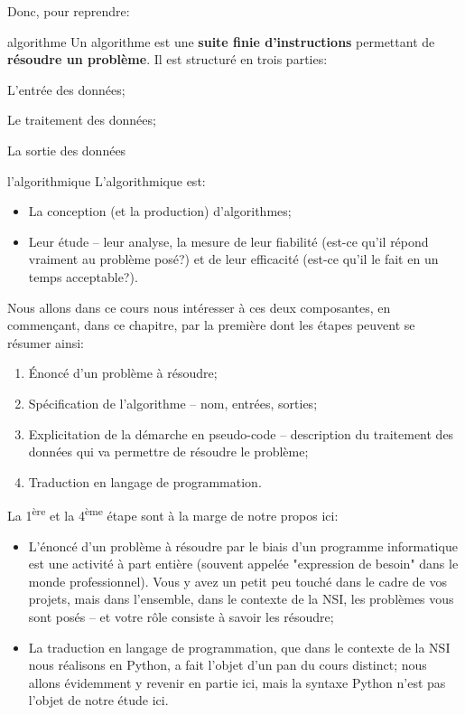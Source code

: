 \documentclass[12pt]{article}
\begin{document}
	Donc, pour reprendre:
	\begin{MaDef}{algorithme}
		Un algorithme est une \textbf{suite finie d'instructions} permettant de \textbf{résoudre un problème}. Il est structuré en trois parties:
		\begin{alphenum}
			\item L'entrée des données;
			\item Le traitement des données;
			\item La sortie des données 
		\end{alphenum}
	\end{MaDef}
	
	\begin{MaDef}{l'algorithmique}
		L'algorithmique est:
		\begin{itemize}
			\item La conception (et la production) d'algorithmes;
			\item Leur étude -- leur analyse, la mesure de leur fiabilité (est-ce qu'il répond vraiment au problème posé?) et de leur efficacité (est-ce qu'il le fait en un temps acceptable?).
		\end{itemize}
	\end{MaDef}
	
	Nous allons dans ce cours nous intéresser à ces deux composantes, en commençant, dans ce chapitre, par la première dont les étapes peuvent se résumer ainsi:
	\begin{enumerate}
		\item Énoncé d'un problème à résoudre;
		\item Spécification de l'algorithme -- nom, entrées, sorties;
		\item Explicitation de la démarche en pseudo-code -- description du traitement des données qui va permettre de résoudre le problème;
		\item Traduction en langage de programmation.
	\end{enumerate}
	
	La 1\textsuperscript{ère} et la 4\textsuperscript{ème} étape sont à la marge de notre propos ici:
	\begin{itemize}
		\item L'énoncé d'un problème à résoudre par le biais d'un programme informatique est une activité à part entière (souvent appelée "expression de besoin" dans le monde professionnel). Vous y avez un petit peu touché dans le cadre de vos projets, mais dans l'ensemble, dans le contexte de la NSI, les problèmes vous sont posés -- et votre rôle consiste à savoir les résoudre;
		\item La traduction en langage de programmation, que dans le contexte de la NSI nous réalisons en Python, a fait l'objet d'un pan du cours distinct; nous allons évidemment y revenir en partie ici, mais la syntaxe Python n'est pas l'objet de notre étude ici.
	\end{itemize}
	
\end{document}
